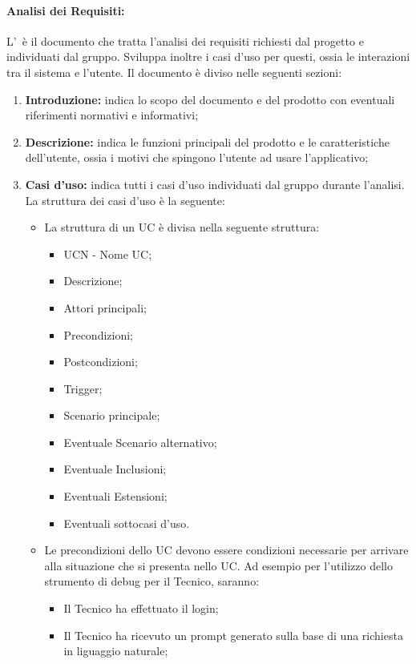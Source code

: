 \paragraph{Analisi dei Requisiti:}
L'\AdR\ è il documento che tratta l'analisi dei requisiti richiesti dal progetto e individuati dal gruppo. Sviluppa inoltre i casi d'uso per questi, ossia le interazioni tra il sistema e l'utente.
Il documento è diviso nelle seguenti sezioni:
\begin{enumerate}
  \item \textbf{Introduzione:} indica lo scopo del documento e del prodotto con eventuali riferimenti normativi e informativi;
  \item \textbf{Descrizione:} indica le funzioni principali del prodotto e le caratteristiche dell'utente, ossia i motivi che spingono l'utente ad usare l'applicativo;
  \item \textbf{Casi d'uso:} indica tutti i casi d'uso individuati dal gruppo durante l'analisi. La struttura dei casi d'uso è la seguente:
  \begin{itemize}
    \item La struttura di un UC è divisa nella seguente struttura:
    \begin{itemize}
      \item UCN - Nome UC;
      \item Descrizione;
      \item Attori principali;
      \item Precondizioni;
      \item Postcondizioni;
      \item Trigger;
      \item Scenario principale;
      \item Eventuale Scenario alternativo;
      \item Eventuale Inclusioni;
      \item Eventuali Estensioni;
      \item Eventuali sottocasi d'uso.
    \end{itemize}
    \item Le precondizioni dello UC devono essere condizioni necessarie per arrivare alla situazione che si presenta nello UC. Ad esempio per l'utilizzo dello strumento di debug per il Tecnico, saranno:
    \begin{itemize}
      \item Il Tecnico ha effettuato il login;
      \item Il Tecnico ha ricevuto un prompt generato sulla base di una richiesta in liguaggio naturale;

\end{itemize}
\end{itemize}
\end{enumerate}
